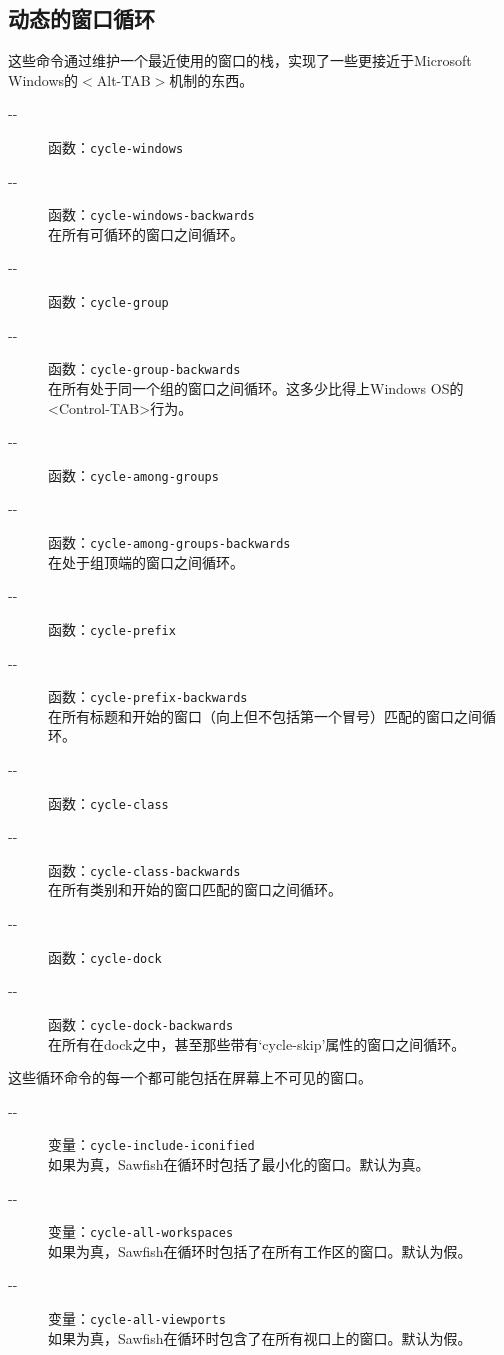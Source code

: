 \documentclass{book}
\begin{document}
\begin{CJK*}{UTF8}{gbsn}
\subsection{动态的窗口循环}
这些命令通过维护一个最近使用的窗口的栈，实现了一些更接近于Microsoft Windows的$<$Alt-TAB$>$机制的东西。
\begin{description}
\item[-{}-] 函数：\verb|cycle-windows|
\item[-{}-] 函数：\verb|cycle-windows-backwards|\\
在所有可循环的窗口之间循环。
\item[-{}-] 函数：\verb|cycle-group|
\item[-{}-] 函数：\verb|cycle-group-backwards|\\
在所有处于同一个组的窗口之间循环。这多少比得上Windows OS的<Control-TAB>行为。
\item[-{}-] 函数：\verb|cycle-among-groups|
\item[-{}-] 函数：\verb|cycle-among-groups-backwards|\\
在处于组顶端的窗口之间循环。
\item[-{}-] 函数：\verb|cycle-prefix|
\item[-{}-] 函数：\verb|cycle-prefix-backwards|\\
在所有标题和开始的窗口（向上但不包括第一个冒号）匹配的窗口之间循环。
\item[-{}-] 函数：\verb|cycle-class|
\item[-{}-] 函数：\verb|cycle-class-backwards|\\
在所有类别和开始的窗口匹配的窗口之间循环。
\item[-{}-] 函数：\verb|cycle-dock|
\item[-{}-] 函数：\verb|cycle-dock-backwards|\\
在所有在dock之中，甚至那些带有`cycle-skip'属性的窗口之间循环。
\end{description}

这些循环命令的每一个都可能包括在屏幕上不可见的窗口。
\begin{description}
\item[-{}-] 变量：\verb|cycle-include-iconified|\\
如果为真，Sawfish在循环时包括了最小化的窗口。默认为真。
\item[-{}-] 变量：\verb|cycle-all-workspaces|\\
如果为真，Sawfish在循环时包括了在所有工作区的窗口。默认为假。
\item[-{}-] 变量：\verb|cycle-all-viewports|\\
如果为真，Sawfish在循环时包含了在所有视口上的窗口。默认为假。
\end{description}


\end{CJK*}
\end{document}
